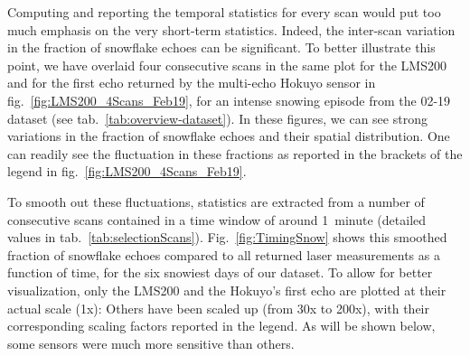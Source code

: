 Computing and reporting the temporal statistics for every scan would put too much emphasis on the very short-term statistics. Indeed, the inter-scan variation in the fraction of snowflake echoes can be significant. To better illustrate this point, we have overlaid four consecutive scans in the same plot for the LMS200 and for the first echo returned by the multi-echo Hokuyo sensor in fig.~\ref{fig:LMS200_4Scans_Feb19}, for an intense snowing episode from the 02-19 dataset (see tab.~\ref{tab:overview-dataset}). In these figures, we can see strong variations in the fraction of snowflake echoes and their spatial distribution. One can readily see the fluctuation in these fractions as reported in the brackets of the legend in fig.~\ref{fig:LMS200_4Scans_Feb19}. 

To smooth out these fluctuations, statistics are extracted from a number of consecutive scans contained in a time window of around 1~minute (detailed values in tab.~\ref{tab:selectionScans}). Fig.~\ref{fig:TimingSnow} shows this smoothed fraction of snowflake echoes compared to all returned laser measurements as a function of time, for the six snowiest days of our dataset. To allow for better visualization, only the LMS200 and the Hokuyo's first echo are plotted at their actual scale (1x): Others have been scaled up (from 30x to 200x), with their corresponding scaling factors reported in the legend. As will be shown below, some sensors were much more sensitive than others.

